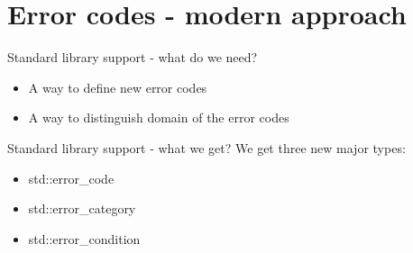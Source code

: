 \documentclass[10pt]{beamer}
\begin{document}
\section{Error codes - modern approach}
\begin{frame}{Standard library support - what do we need?}
	\begin{itemize}
		\item A way to define new error codes
		\item A way to distinguish domain of the error codes
	\end{itemize}
\end{frame}

\begin{frame}{Standard library support - what we get?}
	We get three new major types:
	\begin{itemize}[<+- | alert@+>]
		\item std::error\_code
		\item std::error\_category
		\item std::error\_condition
	\end{itemize}
\end{frame}
\end{document}
